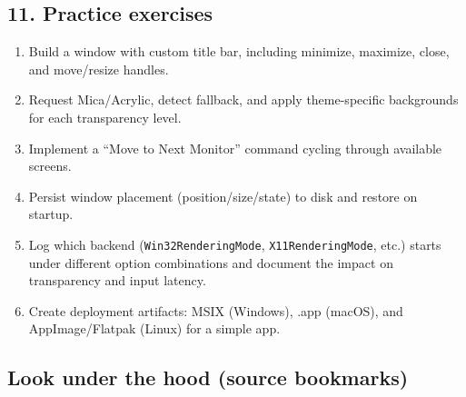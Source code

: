 \subsection{11. Practice exercises}\label{practice-exercises-12}

\begin{enumerate}
\def\labelenumi{\arabic{enumi}.}
\tightlist
\item
  Build a window with custom title bar, including minimize, maximize,
  close, and move/resize handles.
\item
  Request Mica/Acrylic, detect fallback, and apply theme-specific
  backgrounds for each transparency level.
\item
  Implement a ``Move to Next Monitor'' command cycling through available
  screens.
\item
  Persist window placement (position/size/state) to disk and restore on
  startup.
\item
  Log which backend (\passthrough{\lstinline!Win32RenderingMode!},
  \passthrough{\lstinline!X11RenderingMode!}, etc.) starts under
  different option combinations and document the impact on transparency
  and input latency.
\item
  Create deployment artifacts: MSIX (Windows), .app (macOS), and
  AppImage/Flatpak (Linux) for a simple app.
\end{enumerate}

\subsection{Look under the hood (source
bookmarks)}\label{look-under-the-hood-source-bookmarks-16}

